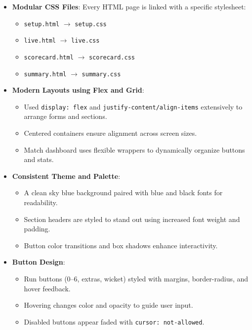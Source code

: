 \documentclass[a4paper,10pt]{article}
\begin{document}
\begin{itemize}
    \item \textbf{Modular CSS Files}: Every HTML page is linked with a specific stylesheet:
    \begin{itemize}
        \item \texttt{setup.html} $\rightarrow$ \texttt{setup.css}
        \item \texttt{live.html} $\rightarrow$ \texttt{live.css}
        \item \texttt{scorecard.html} $\rightarrow$ \texttt{scorecard.css}
        \item \texttt{summary.html} $\rightarrow$ \texttt{summary.css}
    \end{itemize}

    \item \textbf{Modern Layouts using Flex and Grid}:
    \begin{itemize}
        \item Used \texttt{display: flex} and \texttt{justify-content/align-items} extensively to arrange forms and sections.
        \item Centered containers ensure alignment across screen sizes.
        \item Match dashboard uses flexible wrappers to dynamically organize buttons and stats.
    \end{itemize}

    \item \textbf{Consistent Theme and Palette}:
    \begin{itemize}
        \item A clean sky blue background paired with blue and black fonts for readability.
        \item Section headers are styled to stand out using increased font weight and padding.
        \item Button color transitions and box shadows enhance interactivity.
    \end{itemize}

    \item \textbf{Button Design}:
    \begin{itemize}
        \item Run buttons (0–6, extras, wicket) styled with margins, border-radius, and hover feedback.
        \item Hovering changes color and opacity to guide user input.
        \item Disabled buttons appear faded with \texttt{cursor: not-allowed}.
    \end{itemize}


\end{itemize}
\end{document}
